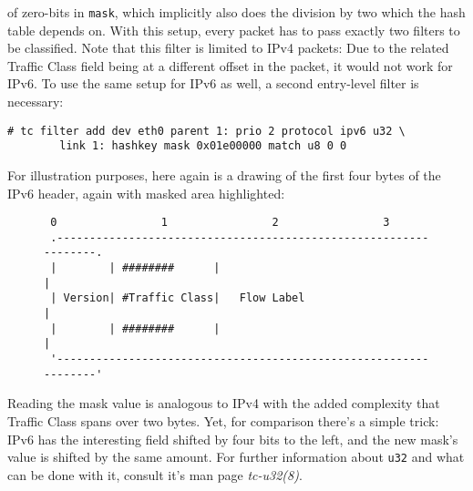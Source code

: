 \documentclass[12pt,twoside]{article}
\newcommand{\man}{\textit}
\newcommand{\filter}{\texttt}
\begin{document}
of zero-bits in \texttt{mask}, which implicitly also does the division by two which the
hash table depends on. With this setup, every packet has to pass exactly two
filters to be classified. Note that this filter is limited to IPv4 packets: Due
to the related Traffic Class field being at a different offset in the packet, it
would not work for IPv6. To use the same setup for IPv6 as well, a second
entry-level filter is necessary:
\begin{Verbatim}
# tc filter add dev eth0 parent 1: prio 2 protocol ipv6 u32 \
        link 1: hashkey mask 0x01e00000 match u8 0 0
\end{Verbatim}
For illustration purposes, here again is a drawing of the first four bytes of
the IPv6 header, again with masked area highlighted:
\begin{figure}[H]
\begin{Verbatim}
 0                1                2                3
 .-----------------------------------------------------------------.
 |        | ########      |                                        |
 | Version| #Traffic Class|   Flow Label                           |
 |        | ########      |                                        |
 '-----------------------------------------------------------------'
\end{Verbatim}
\end{figure}
\noindent
Reading the mask value is analogous to IPv4 with the added complexity that
Traffic Class spans over two bytes. Yet, for comparison there's a simple trick:
IPv6 has the interesting field shifted by four bits to the left, and the new
mask's value is shifted by the same amount. For further information about
\filter{u32} and what can be done with it, consult it's man page
\man{tc-u32(8)}.
\end{document}
